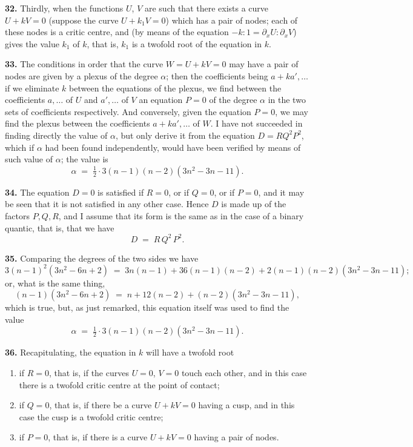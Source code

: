 \documentclass[11pt,a4paper]{article}
\begin{document}
\medskip

\textbf{32.} Thirdly, when the functions $U$, $V$ are such that there exists a curve $U + kV = 0$ (suppose the curve $U + k_1 V = 0$) which has a pair of nodes; each of these nodes is a critic centre, and (by means of the equation $-k : 1 = \partial_x U : \partial_x V$) gives the value $k_1$ of $k$, that is, $k_1$ is a twofold root of the equation in $k$.

\medskip

\textbf{33.} The conditions in order that the curve $W = U + kV = 0$ may have a pair of nodes are given by a plexus of the degree $\alpha$; then the coefficients being $a + ka', \ldots$ if we eliminate $k$ between the equations of the plexus, we find between the coefficients $a, \ldots$ of $U$ and $a', \ldots$ of $V$ an equation $P = 0$ of the degree $\alpha$ in the two sets of coefficients respectively. And conversely, given the equation $P = 0$, we may find the plexus between the coefficients $a + ka', \ldots$ of $W$. I have not succeeded in finding directly the value of $\alpha$, but only derive it from the equation $D = R Q^2 P^2$, which if $\alpha$ had been found independently, would have been verified by means of such value of $\alpha$; the value is
\[
\alpha \;=\; \tfrac{1}{2}\cdot 3(n - 1)(n - 2)(3n^2 - 3n - 11).
\]

\medskip

\textbf{34.} The equation $D = 0$ is satisfied if $R = 0$, or if $Q = 0$, or if $P = 0$, and it may be seen that it is not satisfied in any other case. Hence $D$ is made up of the factors $P, Q, R$, and I assume that its form is the same as in the case of a binary quantic, that is, that we have
\[
D \;=\; R\,Q^2\,P^2.
\]

\medskip

\textbf{35.} Comparing the degrees of the two sides we have
\[
3(n - 1)^2(3n^2 - 6n + 2) \;=\; 3n(n-1) + 36(n-1)(n-2) + 2(n - 1)(n - 2)(3n^2 - 3n - 11);
\]
or, what is the same thing,
\[
(n - 1)(3n^2 - 6n + 2) \;=\; n + 12(n - 2) + (n - 2)(3n^2 - 3n - 11),
\]
which is true, but, as just remarked, this equation itself was used to find the value
\[
\alpha \;=\; \tfrac{1}{2}\cdot 3(n - 1)(n - 2)(3n^2 - 3n - 11).
\]

\medskip

\textbf{36.} Recapitulating, the equation in $k$ will have a twofold root
\begin{enumerate}[label=$\arabic*^\circ$.]
\item if $R = 0$, that is, if the curves $U = 0$, $V = 0$ touch each other, and in this case there is a twofold critic centre at the point of contact;
\item if $Q = 0$, that is, if there be a curve $U + kV = 0$ having a cusp, and in this case the cusp is a twofold critic centre;
\item if $P = 0$, that is, if there is a curve $U + kV = 0$ having a pair of nodes.
\end{enumerate}
\end{document}
